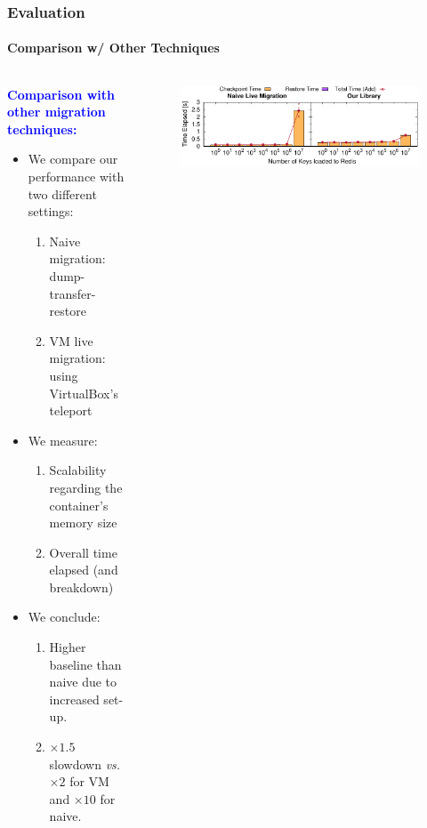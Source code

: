 \documentclass[9pt,    %
    english,            %
    xcolor=table,       %
    envcountsect,        %
    aspectratio=169     %
]{beamer}
\begin{document}
\begin{frame}
    \frametitle{Evaluation}
    \framesubtitle{Comparison w/ Other Techniques}

    \begin{columns}
        \begin{column}{.5\textwidth}

            \vspace{-40pt}

            \textbf{\textcolor{blue}{Comparison with other migration techniques:}}
            \begin{itemize}
                \item We compare our performance with two different settings:
                \begin{enumerate}
                    \item Naive migration: dump-transfer-restore
                    \item VM live migration: using VirtualBox's teleport
                \end{enumerate}
                \item We measure:
                \begin{enumerate}
                    \item Scalability regarding the container's memory size
                    \item Overall time elapsed (and breakdown)
                \end{enumerate}
                \item We conclude:
                \begin{enumerate}
                    \item Higher baseline than naive due to increased set-up.
                    \item $\times 1.5$ slowdown \textit{vs.} $\times 2$ for VM and $\times 10$ for naive.
                \end{enumerate}
            \end{itemize}
        \end{column}
        \begin{column}{.5\textwidth}
            \begin{figure}
                \centering
                \includegraphics[width=\textwidth]{./figs/key_scalability.pdf}

\end{figure}
\end{column}
\end{columns}
\end{frame}
\end{document}
